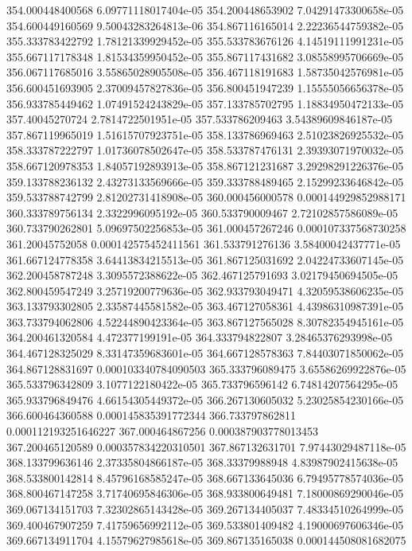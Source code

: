 {354.000448400568 6.09771118017404e-05
354.200448653902 7.04291473300658e-05
354.600449160569 9.50043283264813e-06
354.867116165014 2.22236544759382e-05
355.333783422792 1.78121339929452e-05
355.533783676126 4.14519111991231e-05
355.667117178348 1.81534359950452e-05
355.867117431682 3.08558995706669e-05
356.067117685016 3.55865028905508e-05
356.467118191683 1.58735042576981e-05
356.600451693905 2.37009457827836e-05
356.800451947239 1.15555056656378e-05
356.933785449462 1.07491524243829e-05
357.133785702795 1.18834950472133e-05
357.40045270724 2.7814722501951e-05
357.533786209463 3.54389609846187e-05
357.867119965019 1.51615707923751e-05
358.133786969463 2.51023826925532e-05
358.333787222797 1.01736078502647e-05
358.533787476131 2.39393071970032e-05
358.667120978353 1.84057192893913e-05
358.867121231687 3.29298291226376e-05
359.133788236132 2.43273133569666e-05
359.333788489465 2.15299233646842e-05
359.533788742799 2.81202731418908e-05
360.000456000578 0.000144929852988171
360.333789756134 2.3322996095192e-05
360.533790009467 2.72102857586089e-05
360.733790262801 5.09697502256853e-05
361.000457267246 0.000107337568730258
361.20045752058 0.000142575452411561
361.533791276136 3.58400042437771e-05
361.667124778358 3.64413834215513e-05
361.867125031692 2.04224733607145e-05
362.200458787248 3.3095572388622e-05
362.467125791693 3.02179450694505e-05
362.800459547249 3.25719200779636e-05
362.933793049471 4.32059538606235e-05
363.133793302805 2.33587445581582e-05
363.467127058361 4.43986310987391e-05
363.733794062806 4.52244890423364e-05
363.867127565028 8.30782354945161e-05
364.200461320584 4.472377199191e-05
364.333794822807 3.28465376293998e-05
364.467128325029 8.33147359683601e-05
364.667128578363 7.84403071850062e-05
364.867128831697 0.000103340784090503
365.333796089475 3.65586269922876e-05
365.533796342809 3.1077122180422e-05
365.733796596142 6.74814207564295e-05
365.933796849476 4.66154305449372e-05
366.267130605032 5.23025854230166e-05
366.600464360588 0.000145835391772344
366.733797862811 0.000112193251646227
367.000464867256 0.000387903778013453
367.200465120589 0.000357834220310501
367.867132631701 7.97443029487118e-05
368.133799636146 2.37335804866187e-05
368.33379988948 4.83987902415638e-05
368.533800142814 8.45796168585247e-05
368.667133645036 6.79495778574036e-05
368.800467147258 3.71740695846306e-05
368.933800649481 7.18000869290046e-05
369.067134151703 7.32302865143428e-05
369.267134405037 7.48334510264999e-05
369.400467907259 7.41759656992112e-05
369.533801409482 4.19000697606346e-05
369.667134911704 4.15579627985618e-05
369.867135165038 0.000144508081682075
}
